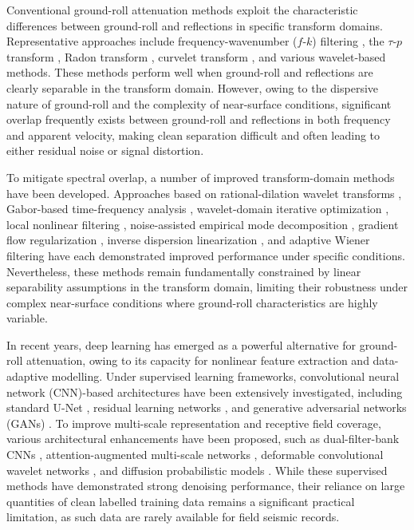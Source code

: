 \documentclass[alpha-refs]{wiley-article}
\begin{document}
Conventional ground-roll attenuation methods exploit the characteristic differences 
between ground-roll and reflections in specific transform domains. Representative 
approaches include frequency-wavenumber ($f$-$k$) filtering \citep{hosseini2015shearlet, 
chen2014random}, the $\tau$-$p$ transform \citep{mitchell1990efficient}, Radon transform 
\citep{naghadeh2021retrieving}, curvelet transform \citep{yuan2018ground, wang2021ground, 
naghizadeh2018ground}, and various wavelet-based methods. These methods perform well when 
ground-roll and reflections are clearly separable in the transform domain. However, owing 
to the dispersive nature of ground-roll and the complexity of near-surface conditions, 
significant overlap frequently exists between ground-roll and reflections in both frequency 
and apparent velocity, making clean separation difficult and often leading to either 
residual noise or signal distortion.

To mitigate spectral overlap, a number of improved transform-domain methods have been 
developed. Approaches based on rational-dilation wavelet transforms 
\citep{mehr2013innovative}, Gabor-based time-frequency analysis \citep{wu2024amplitude}, 
wavelet-domain iterative optimization \citep{iranimehr2021seismic}, local nonlinear 
filtering \citep{yuan2022adaptive}, noise-assisted empirical mode decomposition 
\citep{xiao2022ground}, gradient flow regularization \citep{cai2018ground}, inverse 
dispersion linearization \citep{jin2024improvement}, and adaptive Wiener filtering 
\citep{karsli2004using} have each demonstrated improved performance under specific 
conditions. Nevertheless, these methods remain fundamentally constrained by linear 
separability assumptions in the transform domain, limiting their robustness under complex 
near-surface conditions where ground-roll characteristics are highly variable.

In recent years, deep learning has emerged as a powerful alternative for ground-roll 
attenuation, owing to its capacity for nonlinear feature extraction and data-adaptive 
modelling. Under supervised learning frameworks, convolutional neural network 
(CNN)-based architectures have been extensively investigated, including standard U-Net 
\citep{sun2024ground}, residual learning networks \citep{lan2023seismic}, and generative 
adversarial networks (GANs) \citep{yuan2020ground}. To improve multi-scale representation 
and receptive field coverage, various architectural enhancements have been proposed, such 
as dual-filter-bank CNNs \citep{zhang2022ground}, attention-augmented multi-scale networks 
\citep{yan2025ground, yang2023deep}, deformable convolutional wavelet networks 
\citep{gao2024surface}, and diffusion probabilistic models \citep{li2024conditional}. 
While these supervised methods have demonstrated strong denoising performance, their 
reliance on large quantities of clean labelled training data remains a significant 
practical limitation, as such data are rarely available for field seismic records.
\end{document}
